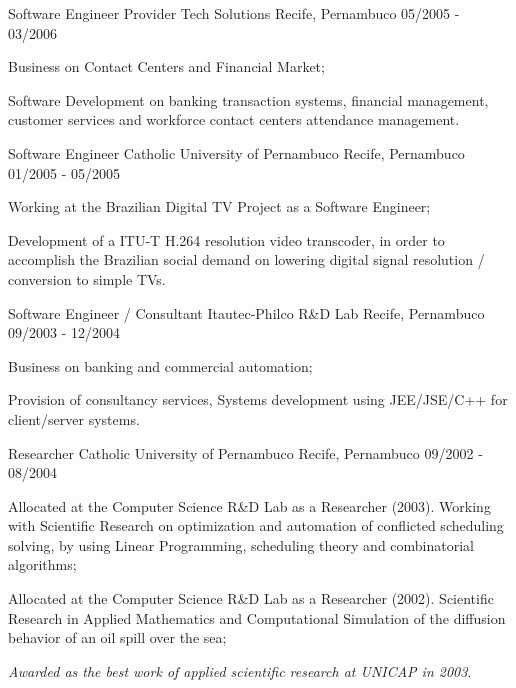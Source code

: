 \begin{cventries}
\cventry
{Software Engineer}
{Provider Tech Solutions}
{Recife, Pernambuco}
{05/2005 - 03/2006}
{
\begin{cvitems}
\item Business on Contact Centers and Financial Market;
\item Software Development on banking transaction systems, financial management, customer services and workforce contact centers attendance management.
\end{cvitems}
}

\cventry
{Software Engineer}
{Catholic University of Pernambuco}
{Recife, Pernambuco}
{01/2005 - 05/2005}
{
\begin{cvitems}
\item Working at the Brazilian Digital TV Project as a Software Engineer;
\item Development of a ITU-T H.264 resolution video transcoder, in order to accomplish the Brazilian social demand on lowering digital signal resolution / conversion to simple TVs.
\end{cvitems}
}

\cventry
{Software Engineer / Consultant}
{Itautec-Philco R\&D Lab}
{Recife, Pernambuco}
{09/2003 - 12/2004}
{
\begin{cvitems}
\item Business on banking and commercial automation;
\item Provision of consultancy services, Systems development using JEE/JSE/C++ for client/server systems.
\end{cvitems}
}

\cventry
{Researcher}
{Catholic University of Pernambuco}
{Recife, Pernambuco}
{09/2002 - 08/2004}
{
\begin{cvitems}
\item Allocated at the Computer Science R\&D Lab as a Researcher (2003). Working with Scientific Research on optimization and automation of conflicted scheduling solving, by using Linear Programming, scheduling theory and combinatorial algorithms;
\item Allocated at the Computer Science R\&D Lab as a Researcher (2002). Scientific Research in Applied Mathematics and Computational Simulation of the diffusion behavior of an oil spill over the sea;
\item \textit{Awarded as the best work of applied scientific research at UNICAP in 2003}.
\end{cvitems}
}

\end{cventries}

\pagebreak
